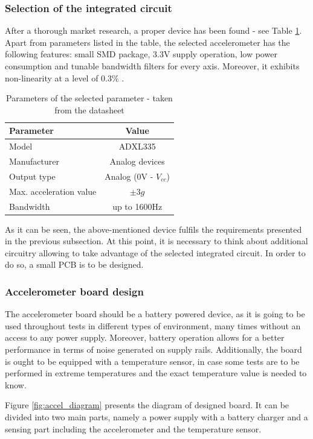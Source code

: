 \documentclass[12pt,a4paper]{article}
\begin{document}
\subsubsection{Selection of the integrated circuit}
After a thorough market research, a proper device has been found - see Table \ref{tab:adxl_params}. Apart from parameters listed in the table, the selected accelerometer has the following features: small SMD package, 3.3V supply operation, low power consumption and tunable bandwidth filters for every axis. Moreover, it exhibits non-linearity at a level of 0.3$\%$ \cite{ADXL}.
\par

\begin{table}[ht!]
\begin{tabular}{|l|c|}
\hline
\textbf{Parameter}		& \textbf{Value} 	\\ \hline
Model  					& ADXL335         	\\ \hline
Manufacturer        	& Analog devices	\\ \hline
Output type           	& Analog (0V - $V_{cc}$)  			\\ \hline
Max. acceleration value &  $\pm{3}g$		\\ \hline
Bandwidth 				&  up to 1600Hz		\\ \hline
\end{tabular}
\caption{Parameters of the selected parameter - taken from the datasheet \cite{ADXL}}
\label{tab:adxl_params}
\end{table}

As it can be seen, the above-mentioned device fulfils the requirements presented in the previous subsection. At this point, it is necessary to think about additional circuitry allowing to take advantage of the selected integrated circuit. In order to do so, a small PCB is to be designed.
\par

\subsubsection{Accelerometer board design}
The accelerometer board should be a battery powered device, as it is going to be used throughout tests in different types of environment, many times without an access to any power supply. Moreover, battery operation allows for a better performance in terms of noise generated on supply rails. Additionally, the board is ought to be equipped with a temperature sensor, in case some tests are to be performed in extreme temperatures and the exact temperature value is needed to know.
\par
Figure \ref{fig:accel_diagram} presents the diagram of designed board. It can be divided into two main parts, namely a power supply with a battery charger and a sensing part including the accelerometer and the temperature sensor.
\par
\end{document}

